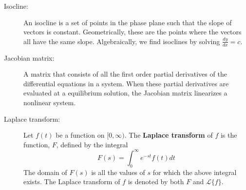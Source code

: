 \begin{description}
\item[Isocline:] An isocline is a set of points in the phase plane such that the slope of vectors is constant. Geometrically, these are the points where the vectors all have the same slope. Algebraically, we find isoclines by solving $\frac{dy}{dx} = c$. 
\item[Jacobian matrix:] A matrix that consists of all the first order partial derivatives of the differential equations in a system. When these partial derivatives are evaluated at a equilibrium solution, the Jacobian matrix linearizes a nonlinear system. 
\item[Laplace transform:] Let $f(t)$ be a function on $[0,\infty)$. The \textbf{Laplace transform} of $f$ is the function, $F$, defined by the integral
\[
F(s)=\int_0^\infty e^{-st}f(t)dt
\]
The domain of $F(s)$ is all the values of $s$ for which the above integral exists. The Laplace transform of $f$ is denoted by both $F$ and $\mathscr{L}\{f\}$. \\


\end{description}
